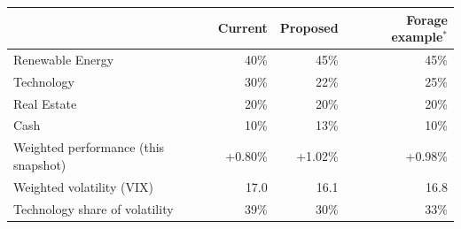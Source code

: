 \begin{tabular}{@{}lrrr@{}}
\toprule
 & \textbf{Current} & \textbf{Proposed} & \textbf{Forage example$^{*}$} \\
\midrule
Renewable Energy & 40\% & 45\% & 45\% \\
Technology & 30\% & 22\% & 25\% \\
Real Estate & 20\% & 20\% & 20\% \\
Cash & 10\% & 13\% & 10\% \\
\midrule
Weighted performance (this snapshot) & +0.80\% & +1.02\% & +0.98\% \\
Weighted volatility (VIX) & 17.0 & 16.1 & 16.8 \\
Technology share of volatility & 39\% & 30\% & 33\% \\
\bottomrule
\end{tabular}